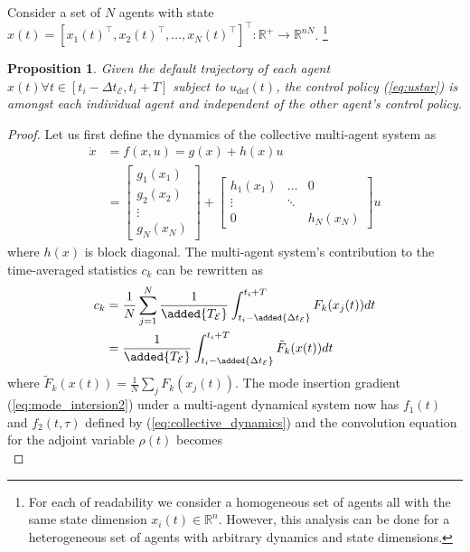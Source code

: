 \documentclass[letterpaper, 10 pt, conference]{ieeeconf}  %
\newtheorem{proposition}{Proposition}
\begin{document}
Consider a set of $N$ agents with state $x(t) = \left[ x_1(t)^\top, x_2(t)^\top, \ldots, x_N(t)^\top\right]^\top : \mathbb{R}^+ \to \mathbb{R}^{n N}$. \footnote{For each of readability we consider a homogeneous set of agents all with the same state dimension $x_i(t) \in \mathbb{R}^n$. However, this analysis can be done for a heterogeneous set of agents with arbitrary dynamics and state dimensions.}
\begin{proposition}
Given the default trajectory of each agent $x(t) \forall t \in \left[ t_i - \Delta t_\mathcal{E}, t_i + T\right]$ subject to $u_\text{def}(t)$, the control policy (\ref{eq:ustar}) is  amongst each individual agent and independent of the other agent's control policy.
\end{proposition}
\begin{proof}
Let us first define the dynamics of the collective multi-agent system as
\begin{align} \label{eq:collective_dynamics}
\dot{x} & = f(x,u) = g(x) + h(x) u \nonumber\\
& = \begin{bmatrix}
g_1(x_1) \\
g_2(x_2) \\
\vdots \\
g_N(x_N)
\end{bmatrix} + 
 \begin{bmatrix}
h_1(x_1) & \ldots & 0\\
\vdots& \ddots & \\
0 & & h_N(x_N)
\end{bmatrix} u
\end{align}
where $h(x)$ is block diagonal.
The multi-agent system's contribution to the time-averaged statistics $c_k$ can be rewritten as
\begin{align}\label{eq:centralized_ck}
c_k & = \frac{1}{N} \sum_{j=1}^N \frac{1}{\added{T_\mathcal{E}}} \int_{t_i - \added{\Delta t_\mathcal{E}}}^{t_i + T} F_k(x_j(t)) dt \nonumber \\
& = \frac{1}{\added{T_\mathcal{E}}} \int_{t_i - \added{\Delta t_\mathcal{E}}}^{t_i+T} \tilde{F}_k(x(t)) dt
\end{align}
where $\tilde{F}_k(x(t)) = \frac{1}{N}\sum_j F_k(x_j(t))$.
The mode insertion gradient (\ref{eq:mode_intersion2}) under a multi-agent dynamical system now has $f_1(t)$ and $f_2(t, \tau)$ defined by (\ref{eq:collective_dynamics}) and the convolution equation for the adjoint variable $\rho(t)$ becomes
\begin{equation}\label{eq:decentralized_adjoint}

\end{equation}
\end{proof}
\end{document}
